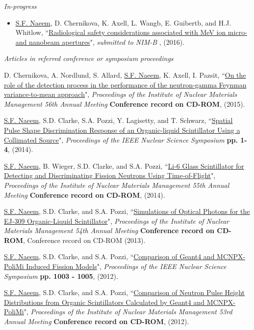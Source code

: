 \documentclass[paper=letter,fontsize=11pt]{scrartcl} %
\newcommand{\PaperEntry}[7]{
		\noindent #1, ``\href{#7}{#2}", \textit{#3} \textbf{#4}, #5 (#6).}
\begin{document}
\textit{{In-progress}}
\begin{itemize}
\item \PaperEntry{\underline{S.F. Naeem}, D. Chernikova, K. Axell, L. Wangb, E. Guibertb, and H.J. Whitlow}{Radiological safety considerations associated with MeV ion micro- and nanobeam apertures}{submitted to NIM-B}{}{}{2016}{}
\end{itemize}

\textit{{Articles in referred conference or symposium proceedings}}
\begin{etaremune}
\item \PaperEntry{D. Chernikova, A. Nordlund, S. Allard, \underline{S.F. Naeem}, K. Axell, I. Pazsit}{On the role of the detection process in the performance of the neutron-gamma Feynman variance-to-mean approach}{Proceedings of the Institute of Nuclear Materials Management 56th Annual Meeting} {Conference record on CD-ROM}{}{2015}
{}

\item \PaperEntry{\underline{S.F. Naeem}, S.D. Clarke, S.A. Pozzi, Y. Lagisetty, and T. Schwarz}{Spatial Pulse Shape Discrimination Response of an Organic-liquid Scintillator Using a Collimated Source}{Proceedings of the IEEE Nuclear Science Symposium} {pp. 1-4}{}{2014}
{http://dx.doi.org/10.1109/NSSMIC.2014.7431168}

\item \PaperEntry{\underline{S.F. Naeem}, B. Wieger, S.D. Clarke, and S.A. Pozzi}{Li-6 Glass Scintillator for Detecting and Discriminating Fission Neutrons Using Time-of-Flight}{Proceedings of the Institute of Nuclear Materials Management 55th Annual Meeting} {Conference record on CD-ROM}{}{2014}
{}

\item \PaperEntry{\underline{S.F. Naeem}, S.D. Clarke, and S.A. Pozzi}{Simulations of Optical Photons for the EJ-309 Organic-Liquid Scintillator}{Proceedings of the Institute of Nuclear Materials Management 54th Annual Meeting} {Conference record on CD-ROM}{Conference record on CD-ROM}{2013}
{}

\item \PaperEntry{\underline{S.F. Naeem}, S.D. Clarke, and S.A. Pozzi}{Comparison of Geant4 and MCNPX-PoliMi Induced Fission Models}{Proceedings of the IEEE Nuclear Science Symposium} {pp. 1003 - 1005}{}{2012}
{http://dx.doi.org/10.1109/NSSMIC.2012.6551258}

\item \PaperEntry{\underline{S.F. Naeem}, S.D. Clarke, and S.A. Pozzi}{Comparison of Neutron Pulse Height Distributions from Organic Scintillators Calculated by Geant4 and MCNPX-PoliMi}{Proceedings of the Institute of Nuclear Materials Management 53rd Annual Meeting} {Conference record on CD-ROM}{}{2012}
{}


\end{etaremune}
\end{document}
